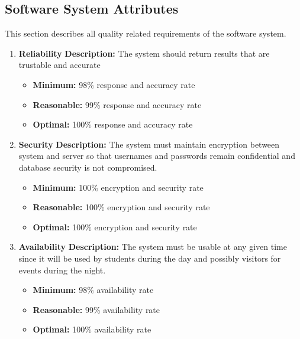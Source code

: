 \documentclass{article}
\begin{document}
	\subsection{Software System Attributes}
		This section describes all quality related requirements of the software system.
 	\begin{enumerate}
 			\item \textbf{Reliability}\newline
 			 \textbf{Description:} The system should return results that are trustable and accurate
 			\begin{itemize}
 			\item \textbf{Minimum:} 98\% response and accuracy rate
 			\item \textbf{Reasonable:} 99\% response and accuracy rate
 			\item \textbf{Optimal:} 100\% response and accuracy rate\newline
 			\end{itemize}
 		
 			\item \textbf{Security}\newline
 			\textbf{Description:} The system must maintain encryption between system and server so that usernames and passwords remain confidential and database security is not compromised.
 			\begin{itemize}
 			\item \textbf{Minimum:} 100\% encryption and security rate
 			\item \textbf{Reasonable:} 100\% encryption and security rate
 			\item \textbf{Optimal:} 100\% encryption and security rate\newline
 			\end{itemize}
 			
 			\item \textbf{Availability}\newline
 			\textbf{Description:} The system must be usable at any given time since it will be used by students during the day and possibly visitors for events during the night.
 			\begin{itemize}
 		\item \textbf{Minimum:} 98\% availability rate
 			\item \textbf{Reasonable:} 99\% availability rate
 			\item \textbf{Optimal:} 100\% availability rate\newline
 			\end{itemize}
 			

\end{enumerate}
\end{document}
